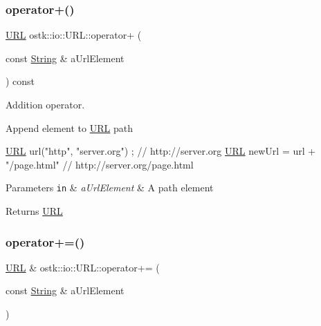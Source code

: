 \subsubsection{\texorpdfstring{operator+()}{operator+()}}
{\footnotesize\ttfamily \hyperlink{classostk_1_1io_1_1_u_r_l}{U\+RL} ostk\+::io\+::\+U\+R\+L\+::operator+ (\begin{DoxyParamCaption}\item[{const \hyperlink{namespaceostk_1_1io_a95d49b120613a7610cb1b4f03b1116b6}{String} \&}]{a\+Url\+Element }\end{DoxyParamCaption}) const}



Addition operator. 

Append element to \hyperlink{classostk_1_1io_1_1_u_r_l}{U\+RL} path


\begin{DoxyCode}
\hyperlink{classostk_1_1io_1_1_u_r_l_a2537e046cef4ac966cc295abb81279c2}{URL} url(\textcolor{stringliteral}{"http"}, \textcolor{stringliteral}{"server.org"}) ; \textcolor{comment}{// http://server.org}
\hyperlink{classostk_1_1io_1_1_u_r_l_a2537e046cef4ac966cc295abb81279c2}{URL} newUrl = url + \textcolor{stringliteral}{"/page.html"} \textcolor{comment}{// http://server.org/page.html}
\end{DoxyCode}



\begin{DoxyParams}[1]{Parameters}
\mbox{\tt in}  & {\em a\+Url\+Element} & A path element \\
\hline
\end{DoxyParams}
\begin{DoxyReturn}{Returns}
\hyperlink{classostk_1_1io_1_1_u_r_l}{U\+RL} 
\end{DoxyReturn}
\mbox{\label{classostk_1_1io_1_1_u_r_l_a07e4a0573aa017fc782ed6712f3df3f9}} 
\subsubsection{\texorpdfstring{operator+=()}{operator+=()}}
{\footnotesize\ttfamily \hyperlink{classostk_1_1io_1_1_u_r_l}{U\+RL} \& ostk\+::io\+::\+U\+R\+L\+::operator+= (\begin{DoxyParamCaption}\item[{const \hyperlink{namespaceostk_1_1io_a95d49b120613a7610cb1b4f03b1116b6}{String} \&}]{a\+Url\+Element }\end{DoxyParamCaption})}



